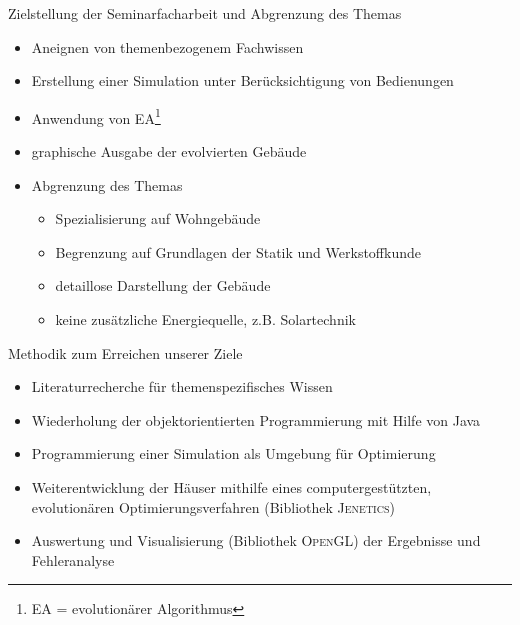 \documentclass[11pt]{beamer}
\begin{document}
\begin{frame}{Zielstellung der Seminarfacharbeit und Abgrenzung des Themas}
\begin{itemize}
\item{Aneignen von themenbezogenem Fachwissen}\pause
\item{Erstellung einer Simulation unter Berücksichtigung von Bedienungen}\pause
\item{Anwendung von EA\footnote{EA = evolutionärer Algorithmus}}\pause
\item{graphische Ausgabe der evolvierten Gebäude}\pause
\item{Abgrenzung des Themas}\pause
\begin{itemize}
\item{Spezialisierung auf Wohngebäude}
\item{Begrenzung auf Grundlagen der Statik und Werkstoffkunde}
\item{detaillose Darstellung der Gebäude}
\item{keine zusätzliche Energiequelle, z.B. Solartechnik} 
\end{itemize}
\end{itemize}
\end{frame}

\begin{frame}{Methodik zum Erreichen unserer Ziele}
\begin{itemize}
\item{Literaturrecherche für themenspezifisches Wissen}\pause
\item{Wiederholung der objektorientierten Programmierung mit Hilfe von Java}\pause
\item{Programmierung einer Simulation als Umgebung für Optimierung}\pause
\item{Weiterentwicklung der Häuser mithilfe eines computergestützten, evolutionären Optimierungsverfahren (Bibliothek \textsc{Jenetics})}\pause
\item{Auswertung und Visualisierung (Bibliothek \textsc{OpenGL}) der Ergebnisse und Fehleranalyse}
\end{itemize}
\end{frame}
\end{document}
